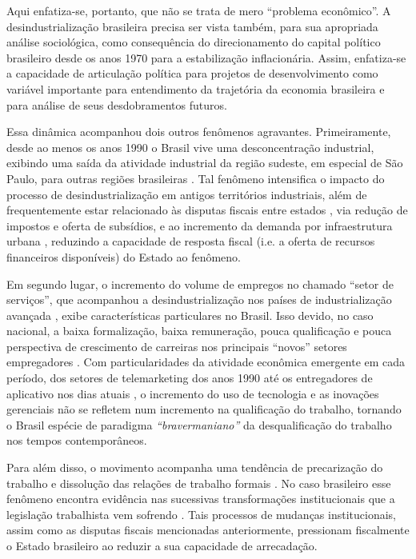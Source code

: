 Aqui enfatiza-se, portanto, que não se trata de mero ``problema
econômico''. A desindustrialização brasileira precisa ser vista também,
para sua apropriada análise sociológica, como consequência do
direcionamento do capital político brasileiro desde os anos 1970 para a
estabilização inflacionária. Assim, enfatiza-se a capacidade de
articulação política para projetos de desenvolvimento como variável
importante para entendimento da trajetória da economia brasileira e para
análise de seus desdobramentos futuros.

Essa dinâmica acompanhou dois outros fenômenos agravantes.
Primeiramente, desde ao menos os anos 1990 o Brasil vive uma
desconcentração industrial, exibindo uma saída da atividade industrial
da região sudeste, em especial de São Paulo, para outras regiões
brasileiras . Tal fenômeno intensifica o impacto do processo
de desindustrialização em antigos territórios industriais, além de
frequentemente estar relacionado às disputas fiscais entre estados
, via redução de impostos e oferta de subsídios, e ao
incremento da demanda por infraestrutura urbana \citep{bluestone_deindustrialization_1982}, reduzindo a capacidade de resposta fiscal (i.e. a oferta de
recursos financeiros disponíveis) do Estado ao fenômeno.

Em segundo lugar, o incremento do volume de empregos no chamado ``setor
de serviços'', que acompanhou a desindustrialização nos países de
industrialização avançada , exibe características
particulares no Brasil. Isso devido, no caso nacional, a baixa
formalização, baixa remuneração, pouca qualificação e pouca perspectiva
de crescimento de carreiras nos principais ``novos'' setores
empregadores . Com particularidades da
atividade econômica emergente em cada período, dos setores de
telemarketing dos anos 1990 até os entregadores de aplicativo nos dias
atuais , o incremento do uso de tecnologia e as inovações gerenciais não
se refletem num incremento na qualificação do trabalho, tornando o
Brasil espécie de paradigma \emph{``bravermaniano''} 
da desqualificação do trabalho nos tempos contemporâneos.

Para além disso, o movimento acompanha uma tendência de precarização do
trabalho e dissolução das relações de trabalho formais .
No caso brasileiro esse fenômeno encontra evidência nas sucessivas
transformações institucionais  que a legislação
trabalhista vem sofrendo . Tais processos de mudanças institucionais, assim como
as disputas fiscais mencionadas anteriormente, pressionam fiscalmente o
Estado brasileiro ao reduzir a sua capacidade de arrecadação.

